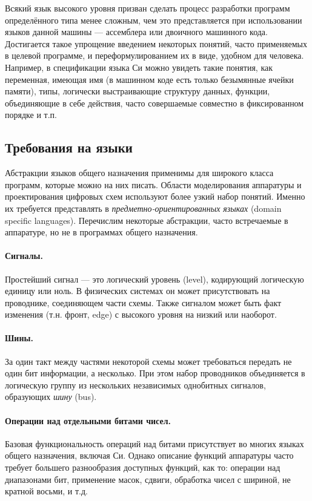 Всякий язык высокого уровня призван сделать процесс разработки программ определённого типа менее сложным, чем это представляется при использовании языков данной машины — ассемблера или двоичного машинного кода. Достигается такое упрощение введением некоторых понятий, часто применяемых в целевой программе, и переформулированием их в виде, удобном для человека. Например, в спецификации языка Си можно увидеть такие понятия, как переменная, имеющая имя (в машинном коде есть только безымянные ячейки памяти), типы, логически выстраивающие структуру данных, функции, объединяющие в себе действия, часто совершаемые совместно в фиксированном порядке и т.п. 

\subsection{Требования на языки}

Абстракции языков общего назначения применимы для широкого класса программ, которые можно на них писать. Области моделирования аппаратуры и проектирования цифровых схем используют более узкий набор понятий. Именно их требуется представлять в \emph{предметно-ориентированных языках} (\abbr domain specific languages). Перечислим некоторые абстракции, часто встречаемые в аппаратуре, но не в программах общего назначения. 

\paragraph{Сигналы.} Простейший сигнал — это логический уровень (\abbr level), кодирующий логическую единицу или ноль. В физических системах он может присутствовать на проводнике, соединяющем части схемы. Также сигналом может быть факт изменения (т.н. фронт, \abbr edge) с высокого уровня на низкий или наоборот.

\paragraph{Шины.} За один такт между частями некоторой схемы может требоваться передать не один бит информации, а несколько. При этом набор проводников объединяется в логическую группу из нескольких независимых однобитных сигналов, образующих \emph{шину} (\abbr bus).

\paragraph{Операции над отдельными битами чисел.} Базовая функциональность операций над битами присутствует во многих языках общего назначения, включая Си. Однако описание функций аппаратуры часто требует большего разнообразия доступных функций, как то: операции над диапазонами бит, применение масок, сдвиги, обработка чисел с шириной, не кратной восьми, и т.д.


